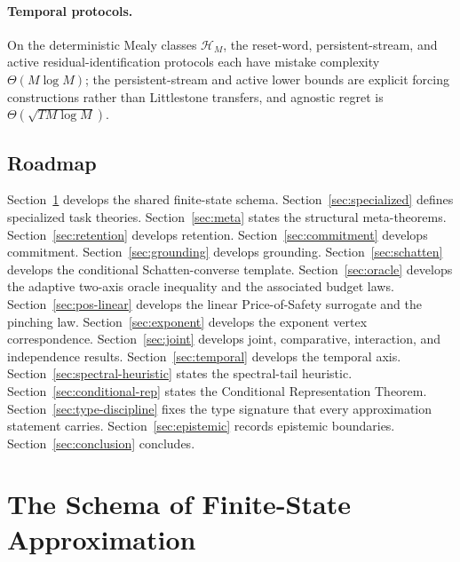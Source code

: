 \documentclass[12pt]{article}
\theoremstyle{definition}
\begin{document}
\paragraph{Temporal protocols.}
On the deterministic Mealy classes $\mathcal H_M$, the reset-word,
persistent-stream, and active residual-identification protocols each have
mistake complexity $\Theta(M\log M)$; the persistent-stream and active
lower bounds are explicit forcing constructions rather than Littlestone
transfers, and agnostic regret is $\Theta(\sqrt{TM\log M})$.

\subsection{Roadmap}
\label{subsec:roadmap}

Section~\ref{sec:schema} develops the shared finite-state schema.
Section~\ref{sec:specialized} defines specialized task theories.
Section~\ref{sec:meta} states the structural meta-theorems.
Section~\ref{sec:retention} develops retention.
Section~\ref{sec:commitment} develops commitment.
Section~\ref{sec:grounding} develops grounding.
Section~\ref{sec:schatten} develops the conditional Schatten-converse
template.
Section~\ref{sec:oracle} develops the adaptive two-axis oracle inequality and
the associated budget laws.
Section~\ref{sec:pos-linear} develops the linear Price-of-Safety surrogate and
the pinching law.
Section~\ref{sec:exponent} develops the exponent vertex correspondence.
Section~\ref{sec:joint} develops joint, comparative, interaction, and
independence results.
Section~\ref{sec:temporal} develops the temporal axis.
Section~\ref{sec:spectral-heuristic} states the spectral-tail heuristic.
Section~\ref{sec:conditional-rep} states the Conditional Representation
Theorem.
Section~\ref{sec:type-discipline} fixes the type signature that every
approximation statement carries.
Section~\ref{sec:epistemic} records epistemic boundaries.
Section~\ref{sec:conclusion} concludes.

\section{The Schema of Finite-State Approximation}
\label{sec:schema}
\end{document}
